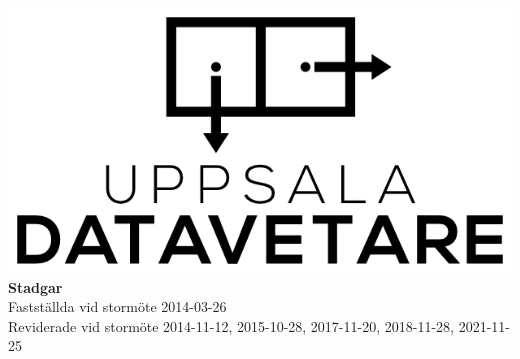 \documentclass[a4paper]{article}
\begin{document}
\begin{titlepage}
  \vspace*{\fill}
  \centering
  \vfill
  \vfill
  \includegraphics[width=\textwidth]{UD_center.png}
  {\huge\textbf{Stadgar}\\
    \vspace{0.3em}
    \large{Fastställda vid stormöte 2014-03-26\\
      Reviderade vid stormöte 2014-11-12, 2015-10-28, 2017-11-20, 2018-11-28, 2021-11-25}}
  \vfill
  \vfill
  \vspace*{\fill}
\end{titlepage}
\renewcommand{\contentsname}{Innehåll\hfill\small Sida}
\tableofcontents
\cleardoublepage 
\setcounter{page}{1}
\cfoot{\thepage}
\end{document}
